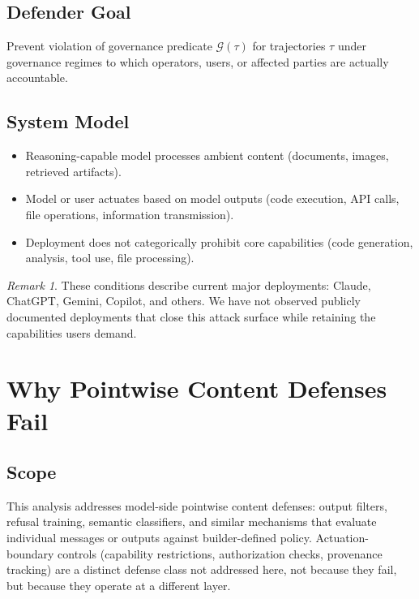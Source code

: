 \documentclass[11pt]{article}
\theoremstyle{definition}
\theoremstyle{plain}
\theoremstyle{remark}
\newtheorem{remark}{Remark}[section]
\newcommand{\G}{\mathcal{G}}
\begin{document}
\subsection{Defender Goal}

Prevent violation of governance predicate $\G(\tau)$ for trajectories $\tau$ under governance regimes to which operators, users, or affected parties are actually accountable.

\subsection{System Model}

\begin{itemize}[leftmargin=2em]
\item Reasoning-capable model processes ambient content (documents, images, retrieved artifacts).
\item Model or user actuates based on model outputs (code execution, API calls, file operations, information transmission).
\item Deployment does not categorically prohibit core capabilities (code generation, analysis, tool use, file processing).
\end{itemize}

\begin{remark}
These conditions describe current major deployments: Claude, ChatGPT, Gemini, Copilot, and others. We have not observed publicly documented deployments that close this attack surface while retaining the capabilities users demand.
\end{remark}

\section{Why Pointwise Content Defenses Fail}
\label{sec:defenses}

\subsection{Scope}

This analysis addresses model-side pointwise content defenses: output filters, refusal training, semantic classifiers, and similar mechanisms that evaluate individual messages or outputs against builder-defined policy. Actuation-boundary controls (capability restrictions, authorization checks, provenance tracking) are a distinct defense class not addressed here, not because they fail, but because they operate at a different layer.
\end{document}
